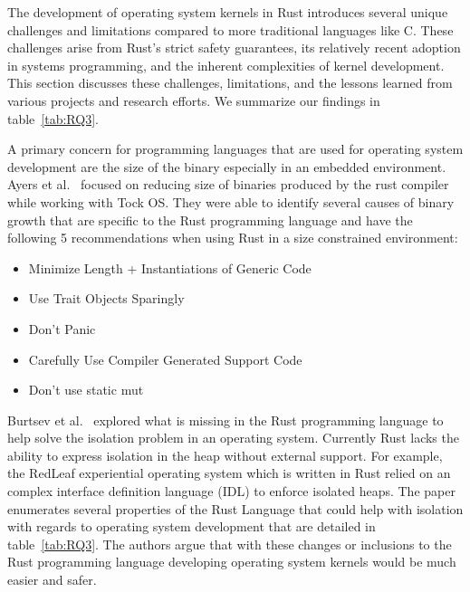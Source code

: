 \documentclass[sigconf]{acmart}
\begin{document}
The development of operating system kernels in Rust introduces several unique challenges and
limitations compared to more traditional languages like C. These challenges arise from Rust’s strict
safety guarantees, its relatively recent adoption in systems programming, and the inherent
complexities of kernel development. This section discusses these challenges, limitations, and the
lessons learned from various projects and research efforts.  We summarize our findings in
table~\ref{tab:RQ3}.

A primary concern for programming languages that are used for operating system development are the
size of the binary especially in an embedded environment.  Ayers et al.~\cite{Ayers2022-sf} focused
on reducing size of binaries produced by the rust compiler while working with Tock OS. They were
able to identify several  causes of binary growth that are specific to the Rust programming language
and have the following 5 recommendations when using Rust in a size constrained environment:
\begin{itemize}
  \item Minimize Length + Instantiations of Generic Code
  \item Use Trait Objects Sparingly
  \item Don't Panic
  \item Carefully Use Compiler Generated Support Code
  \item Don't use static mut
\end{itemize}

Burtsev et al.~\cite{Burtsev2021-mh} explored what is missing in the Rust programming language to
help solve the isolation problem in an operating system. Currently Rust lacks the ability to express
isolation in the heap without external support. For example, the RedLeaf experiential operating
system which is written in Rust relied on an complex interface definition language (IDL) to enforce
isolated heaps. The paper enumerates several properties of the Rust Language that could help with
isolation with regards to operating system development that are detailed in table~\ref{tab:RQ3}. The
authors argue that with these changes or inclusions to the Rust programming language developing
operating system kernels would be much easier and safer.
\end{document}
